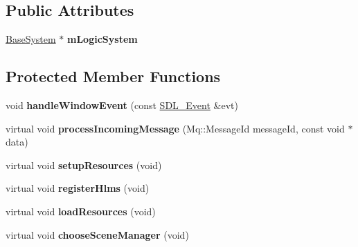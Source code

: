 \subsection*{Public Attributes}
\begin{DoxyCompactItemize}
\item 
\mbox{\label{class_common_1_1_graphics_system_a0fd3f9ba43027f8dcebeda885302e564}} 
\hyperlink{class_common_1_1_base_system}{Base\+System} $\ast$ {\bfseries m\+Logic\+System}
\end{DoxyCompactItemize}
\subsection*{Protected Member Functions}
\begin{DoxyCompactItemize}
\item 
\mbox{\label{class_common_1_1_graphics_system_a16f86321da0331beaa393b9e1bbd48bd}} 
void {\bfseries handle\+Window\+Event} (const \hyperlink{union_s_d_l___event}{S\+D\+L\+\_\+\+Event} \&evt)
\item 
\mbox{\label{class_common_1_1_graphics_system_a8d286a151ed9a65f0eebe1ac119e2d59}} 
virtual void {\bfseries process\+Incoming\+Message} (Mq\+::\+Message\+Id message\+Id, const void $\ast$data)
\item 
\mbox{\label{class_common_1_1_graphics_system_a6ca699c2cd358f6101d7c00f605a515a}} 
virtual void {\bfseries setup\+Resources} (void)
\item 
\mbox{\label{class_common_1_1_graphics_system_a17ad5ae3ca1efd63f7436d977e7f2657}} 
virtual void {\bfseries register\+Hlms} (void)
\item 
\mbox{\label{class_common_1_1_graphics_system_ab91bf390248b3098db3b739e066092b1}} 
virtual void {\bfseries load\+Resources} (void)
\item 
\mbox{\label{class_common_1_1_graphics_system_a6fc846f42d2011cfdeb465aa9ef44b20}} 
virtual void {\bfseries choose\+Scene\+Manager} (void)
\item 

\end{DoxyCompactItemize}
